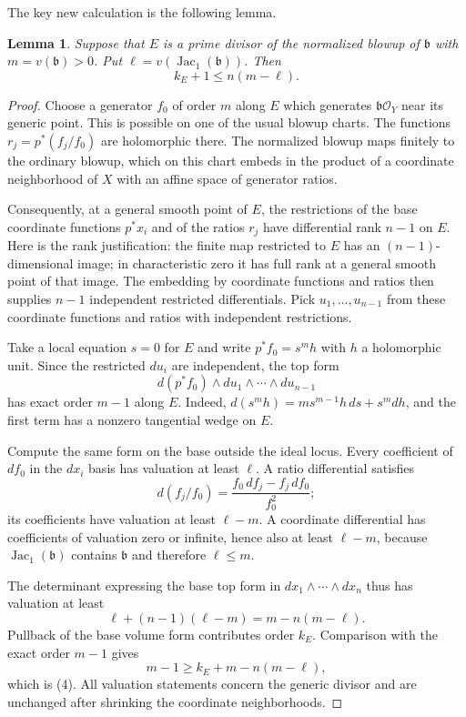 \documentclass[11pt]{article}
\newcommand{\Jac}{\operatorname{Jac}}
\newtheorem{lemma}{Lemma}
\begin{document}
The key new calculation is the following lemma.

\begin{lemma}
Suppose that $E$ is a prime divisor of the normalized blowup of
$\mathfrak b$ with $m=v(\mathfrak b)>0$. Put
$\ell=v(\Jac_1(\mathfrak b))$. Then
\[
 k_E+1\leq n(m-\ell).
 \tag{4}
\]
\end{lemma}

\begin{proof}
Choose a generator $f_0$ of order $m$ along $E$ which generates
$\mathfrak b\mathcal O_Y$ near its generic point. This is possible
on one of the usual blowup charts. The functions
$r_j=p^*(f_j/f_0)$ are holomorphic there.
The normalized blowup maps finitely to the ordinary blowup,
which on this chart embeds in the product of a coordinate
neighborhood of $X$ with an affine space of generator ratios.

Consequently, at a general smooth point of $E$, the restrictions
of the base coordinate functions $p^*x_i$ and of the ratios
$r_j$ have differential rank $n-1$ on $E$.
Here is the rank justification: the finite map restricted to
$E$ has an $(n-1)$-dimensional image; in characteristic zero
it has full rank at a general smooth point of that image.
The embedding by coordinate functions and ratios then supplies
$n-1$ independent restricted differentials. Pick $u_1,\ldots,
u_{n-1}$ from these coordinate functions and ratios with
independent restrictions.

Take a local equation $s=0$ for $E$ and write
$p^*f_0=s^m h$ with $h$ a holomorphic unit. Since the restricted
$du_i$ are independent, the top form
\[
 d(p^*f_0)\wedge du_1\wedge\cdots\wedge du_{n-1}
\]
has exact order $m-1$ along $E$. Indeed,
$d(s^mh)=m s^{m-1}h\,ds+s^m dh$, and the first term has a
nonzero tangential wedge on $E$.

Compute the same form on the base outside the ideal locus.
Every coefficient of $df_0$ in the $dx_i$ basis has valuation
at least $\ell$. A ratio differential satisfies
\[
 d(f_j/f_0)=\frac{f_0\,df_j-f_j\,df_0}{f_0^2};
 \tag{5}
\]
its coefficients have valuation at least $\ell-m$.
A coordinate differential has coefficients of valuation
zero or infinite, hence also at least $\ell-m$, because
$\Jac_1(\mathfrak b)$ contains $\mathfrak b$ and
therefore $\ell\leq m$.

The determinant expressing the base top form in
$dx_1\wedge\cdots\wedge dx_n$ thus has valuation at least
\[
 \ell+(n-1)(\ell-m)=m-n(m-\ell).
 \tag{6}
\]
Pullback of the base volume form contributes order $k_E$.
Comparison with the exact order $m-1$ gives
\[
 m-1\geq k_E+m-n(m-\ell),
\]
which is (4).
All valuation statements concern the generic divisor and are
unchanged after shrinking the coordinate neighborhoods.
\end{proof}
\end{document}
